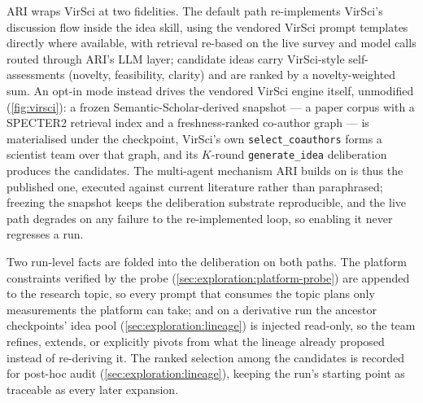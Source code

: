 ARI wraps VirSci at two fidelities. The default path re-implements
VirSci's discussion flow inside the idea skill, using the vendored
VirSci prompt templates directly where available, with retrieval
re-based on the live survey and model calls routed through ARI's LLM
layer; candidate ideas carry VirSci-style self-assessments (novelty,
feasibility, clarity) and are ranked by a novelty-weighted sum. An
opt-in  mode instead drives the vendored VirSci
engine itself, unmodified (\cref{fig:virsci}): a frozen
Semantic-Scholar-derived snapshot --- a paper corpus with a SPECTER2
retrieval index and a freshness-ranked co-author graph --- is
materialised under the checkpoint, VirSci's own
\texttt{select\_coauthors} forms a scientist team over that graph,
and its $K$-round \texttt{generate\_idea} deliberation produces the
candidates. The multi-agent mechanism ARI builds on is thus the
published one, executed against current literature rather than
paraphrased; freezing the snapshot keeps the deliberation substrate
reproducible, and the live path degrades on any failure to the
re-implemented loop, so enabling it never regresses a run.

Two run-level facts are folded into the deliberation on both paths.
The platform constraints verified by the probe
(\cref{sec:exploration:platform-probe}) are appended to the research
topic, so every prompt that consumes the topic plans only
measurements the platform can take; and on a derivative run the
ancestor checkpoints' idea pool (\cref{sec:exploration:lineage}) is
injected read-only, so the team refines, extends, or explicitly
pivots from what the lineage already proposed instead of re-deriving
it. The ranked selection among the candidates is recorded for
post-hoc audit (\cref{sec:exploration:lineage}), keeping the run's
starting point as traceable as every later expansion.
